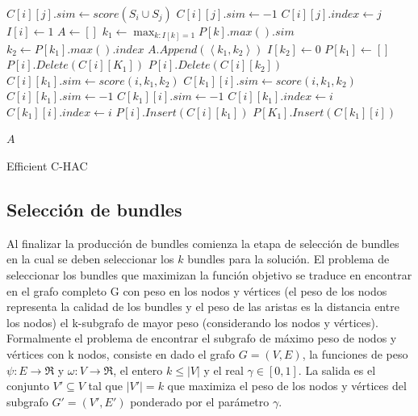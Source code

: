 \begin{algorithm}[H]
\begin{algorithmic}[1]
			\STATE $C[i][j].sim \leftarrow score(S_i \cup S_j)$
		\ELSE
			\STATE $C[i][j].sim \leftarrow -1$
		\ENDIF
		\STATE $C[i][j].index \leftarrow j$
	\ENDFOR
	\STATE $I[i] \leftarrow 1$
\ENDFOR
\STATE $A \leftarrow []$
	\STATE $k_1 \leftarrow \max_{k:I[k]=1}{P[k].max().sim}$
		\BREAK
	\ENDIF
	\STATE $k_2 \leftarrow P[k_1].max().index$
	\STATE $A.Append(\left\langle k_1,k_2 \right\rangle)$
	\STATE $I[k_2] \leftarrow 0$
	\STATE $P[k_1] \leftarrow []$
		\STATE $P[i].Delete(C[i][K_1])$
		\STATE $P[i].Delete(C[i][k_2])$
			\STATE $C[i][k_1].sim \leftarrow score(i,k_1,k_2)$
			\STATE $C[k_1][i].sim \leftarrow score(i,k_1,k_2)$
		\ELSE
			\STATE $C[i][k_1].sim \leftarrow -1$
			\STATE $C[k_1][i].sim \leftarrow -1$
		\ENDIF
		\STATE $C[i][k_1].index \leftarrow i$
		\STATE $C[k_1][i].index \leftarrow i$		
		\STATE $P[i].Insert(C[i][k_1])$
		\STATE $P[K_1].Insert(C[k_1][i])$		
	\ENDFOR
\ENDFOR

\RETURN $A$
\end{algorithmic}
\caption{Efficient C-HAC}\label{alg:Efficient C-HAC}
\end{algorithm}

\subsection{Selección de bundles}
Al finalizar la producción de bundles comienza la etapa de selección de bundles en la cual se deben seleccionar los $k$ bundles para la solución. El problema de seleccionar los bundles que maximizan la función objetivo se traduce en encontrar en el grafo completo G con peso en los nodos y vértices (el peso de los nodos representa la calidad de los bundles y el peso de las aristas es la distancia entre los nodos) el k-subgrafo de mayor peso (considerando los nodos y vértices).\\
Formalmente el problema de encontrar el subgrafo de máximo peso de nodos y vértices con k nodos, consiste en dado el grafo $ G = (V,E) $, la funciones de peso $\psi : E \rightarrow \Re$ y $\omega : V \rightarrow \Re$, el entero $ k \leq |V| $ y el real $\gamma \in [0,1]$. La salida es el conjunto $V' \subseteq V$ tal que $|V'| = k$ que maximiza el peso de los nodos y vértices del subgrafo $G' = (V', E')$ ponderado por el parámetro $\gamma$.

